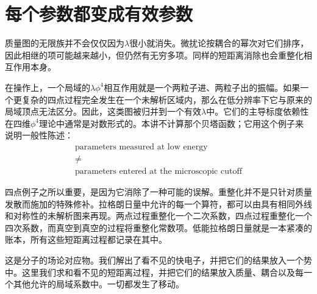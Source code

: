 \section{每个参数都变成有效参数}

质量图的无限族并不会仅仅因为\(\lambda\)很小就消失。微扰论按耦合的幂次对它们排序，因此相继的项可能越来越小，但仍然有无穷多项。同样的短距离消除也会重整化相互作用本身。

\begin{classroomqa}
\end{classroomqa}

在操作上，一个局域的\(\lambda\phi^4\)相互作用就是一个两粒子进、两粒子出的振幅。如果一个更复杂的四点过程完全发生在一个未解析区域内，那么在低分辨率下它与原来的局域顶点无法区分。因此，这类图被归并到一个有效\(\lambda\)中。它们的主导标度依赖性在四维\(\phi^4\)理论中通常是对数形式的。本讲不计算那个贝塔函数；它用这个例子来说明一般性陈述：
\begin{equation}
\begin{gathered}
\text{parameters measured at low energy}\\
\ne\\
\text{parameters entered at the microscopic cutoff}
\end{gathered}
\end{equation}

四点例子之所以重要，是因为它消除了一种可能的误解。重整化并不是只针对质量发散而施加的特殊修补。拉格朗日量中允许的每一个算符，都可以由具有相同外线和对称性的未解析图来再现。两点过程重整化一个二次系数，四点过程重整化一个四次系数，而真空到真空的过程将重整化常数项。低能拉格朗日量就是一本紧凑的账本，所有这些短距离过程都记录在其中。

\begin{classroomqa}
\end{classroomqa}

这是分子的场论对应物。我们解出了看不见的快电子，并把它们的结果放入一个势中。这里我们求和看不见的短距离过程，并把它们的结果放入质量、耦合以及每一个其他允许的局域系数中。一切都发生了移动。

